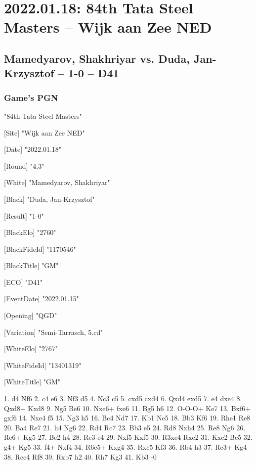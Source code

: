 \documentclass[9pt]{extarticle}
\begin{document}
\section*{2022.01.18: 84th Tata Steel Masters -- Wijk aan Zee NED}

\subsection*{Mamedyarov, Shakhriyar vs. Duda, Jan-Krzysztof -- 1-0 -- D41}
\subsubsection*{Game's PGN}
\begin{flushleft}
[Event] "84th Tata Steel Masters"

[Site] "Wijk aan Zee NED"

[Date] "2022.01.18"

[Round] "4.3"

[White] "Mamedyarov, Shakhriyar"

[Black] "Duda, Jan-Krzysztof"

[Result] "1-0"

[BlackElo] "2760"

[BlackFideId] "1170546"

[BlackTitle] "GM"

[ECO] "D41"

[EventDate] "2022.01.15"

[Opening] "QGD"

[Variation] "Semi-Tarrasch, 5.cd"

[WhiteElo] "2767"

[WhiteFideId] "13401319"

[WhiteTitle] "GM"

\end{flushleft}
\begin{flushleft}
1. d4 Nf6 2. c4 e6 3. Nf3 d5 4. Nc3 c5 5. cxd5 cxd4 6. Qxd4 exd5 7. e4 dxe4 8. Qxd8+ Kxd8 9. Ng5 Be6 10. Nxe6+ fxe6 11. Bg5 h6 12. O-O-O+ Ke7 13. Bxf6+ gxf6 14. Nxe4 f5 15. Ng3 h5 16. Bc4 Nd7 17. Kb1 Ne5 18. Bb3 Kf6 19. Rhe1 Re8 20. Ba4 Re7 21. h4 Ng6 22. Rd4 Rc7 23. Bb3 e5 24. Rd8 Nxh4 25. Re8 Ng6 26. Re6+ Kg5 27. Bc2 h4 28. Re3 e4 29. Nxf5 Kxf5 30. R3xe4 Rxc2 31. Kxc2 Bc5 32. g4+ Kg5 33. f4+ Nxf4 34. R6e5+ Kxg4 35. Rxc5 Kf3 36. Rb4 h3 37. Rc3+ Kg4 38. Rcc4 Rf8 39. Rxb7 h2 40. Rh7 Kg3 41. Kb3 \quad  {}-0
\end{flushleft}
\parindent 0mm
\end{document}
